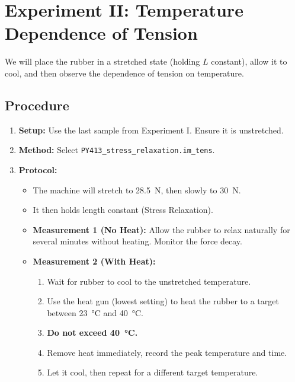 \documentclass[12pt]{article}     %
\begin{document}
\section{Experiment II: Temperature Dependence of Tension}

We will place the rubber in a stretched state (holding $L$ constant), allow it to cool, and then observe the dependence of tension on temperature.

\subsection*{Procedure}
\begin{enumerate}[resume]
    \item \textbf{Setup:} Use the last sample from Experiment I. Ensure it is unstretched.
    \item \textbf{Method:} Select \texttt{PY413\_stress\_relaxation.im\_tens}.
    \item \textbf{Protocol:}
    \begin{itemize}
        \item The machine will stretch to \SI{28.5}{N}, then slowly to \SI{30}{N}.
        \item It then holds length constant (Stress Relaxation).
        \item \textbf{Measurement 1 (No Heat):} Allow the rubber to relax naturally for several minutes without heating. Monitor the force decay.
        \item \textbf{Measurement 2 (With Heat):} 
        \begin{enumerate}
            \item Wait for rubber to cool to the unstretched temperature.
            \item Use the heat gun (lowest setting) to heat the rubber to a target between \SI{23}{\celsius} and \SI{40}{\celsius}.
            \item \textbf{Do not exceed \SI{40}{\celsius}.}
            \item Remove heat immediately, record the peak temperature and time.
            \item Let it cool, then repeat for a different target temperature.
        \end{enumerate}
    \end{itemize}
\end{enumerate}

\end{document}
